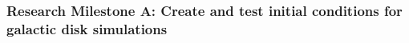 \documentclass[11pt,letterpaper,english]{article}
\begin{document}

\subsubsection{Research Milestone A: Create and test initial conditions for galactic disk simulations}
\end{document}
